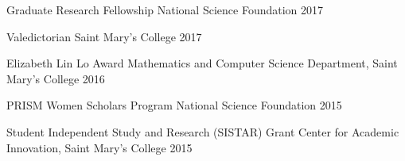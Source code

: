 
\begin{cvhonors}

  \cvhonor
    {Graduate Research Fellowship}
    {National Science Foundation}
    {}
    {2017}
    
  \cvhonor
    {Valedictorian}
    {Saint Mary's College}
    {}
    {2017}
    
  \cvhonor
    {Elizabeth Lin Lo Award}
    {Mathematics and Computer Science Department, Saint Mary's College}
    {}
    {2016}
    
  \cvhonor
    {PRISM Women Scholars Program}
    {National Science Foundation}
    {}
    {2015}
    
  \cvhonor
    {Student Independent Study and Research (SISTAR) Grant}
    {Center for Academic Innovation, Saint Mary's College}
    {}
    {2015}
    
\end{cvhonors}